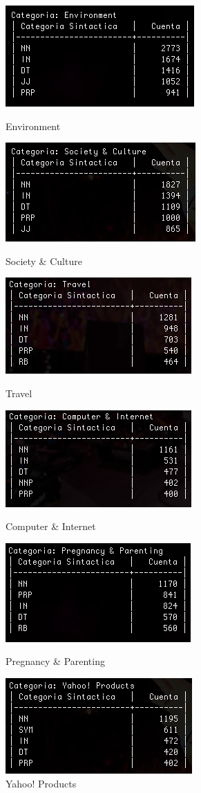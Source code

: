 \documentclass{article}
\begin{document}
\newpage
\begin{figure}
\centering
\includegraphics[scale=0.5]{figuras/cat21.png}
\caption{Environment}
\label{fig:cat21}
\includegraphics[scale=0.5]{figuras/cat22.png}
\caption{Society \& Culture}
\label{fig:cat22}
\includegraphics[scale=0.5]{figuras/cat23.png}
\caption{Travel}
\label{fig:cat23}
\includegraphics[scale=0.5]{figuras/cat24.png}
\caption{Computer \& Internet}
\label{fig:cat24}
\includegraphics[scale=0.5]{figuras/cat25.png}
\caption{Pregnancy \& Parenting}
\label{fig:cat25}
\includegraphics[scale=0.5]{figuras/cat26.png}
\caption{Yahoo! Products}
\label{fig:cat26}
\end{figure}
\end{document}

